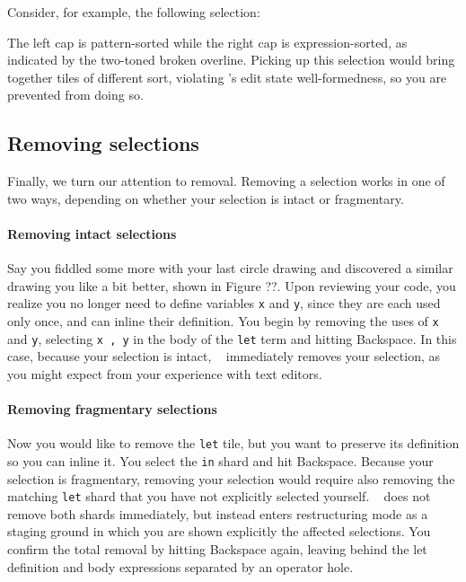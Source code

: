 Consider, for example, the following selection:


\noindent
The left cap is pattern-sorted while the right cap
is expression-sorted, as indicated by the two-toned
broken overline.
Picking up this selection would bring together
tiles of different sort, violating \tylr's edit
state well-formedness, so you are prevented from doing so.



\subsection{Removing selections}
Finally, we turn our attention to removal.
Removing a selection works in one of two ways,
depending on whether your selection is intact or fragmentary.

\paragraph{Removing intact selections}
Say you fiddled some more with your last circle drawing
and discovered a similar drawing you like a bit better,
shown in Figure ??.
Upon reviewing your code, you realize you no longer
need to define variables \texttt{x} and \texttt{y},
since they are each used only once, and can inline
their definition.
You begin by removing the uses of \texttt{x} and \texttt{y},
selecting \texttt{x , y} in the body of the \texttt{let}
term and hitting Backspace.
In this case, because your selection is intact, \tylr~
immediately removes your selection, as you might
expect from your experience with text editors.

\paragraph{Removing fragmentary selections}
Now you would like to remove the \texttt{let} tile,
but you want to preserve its definition so you
can inline it.
You select the \texttt{in} shard and hit Backspace.
Because your selection is fragmentary, removing
your selection would require also removing the
matching \texttt{let} shard that you have not
explicitly selected yourself.
\tylr~ does not remove both shards immediately, but
instead enters restructuring mode as a staging ground
in which you are shown explicitly the affected
selections.
You confirm the total removal by hitting Backspace again,
leaving behind the let definition and body expressions
separated by an operator hole.

